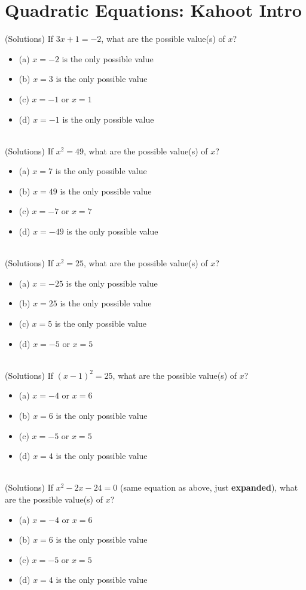 \documentclass{article}
\begin{document}
\clearpage
\section{Quadratic Equations: Kahoot Intro}
(Solutions) If $3x+1 = -2$, what are the possible value(s) of $x$?
\begin{itemize}
\item[] (a) $x=-2$ is the only possible value
\item[] (b) $x=3$ is the only possible value
\item[] (c) $x=-1$ or $x=1$
\item[] (d) $x=-1$ is the only possible value
\end{itemize}\hrulefill \\[10pt]
(Solutions) If $x^2 = 49$, what are the possible value(s) of $x$?
\begin{itemize}
\item[](a) $x=7$ is the only possible value
\item[](b) $x=49$ is the only possible value
\item[](c) $x=-7$ or $x=7$
\item[](d) $x=-49$ is the only possible value
\end{itemize}\hrulefill \\[10pt]
(Solutions) If $x^2 = 25$, what are the possible value(s) of $x$?
\begin{itemize}
\item[](a) $x=-25$ is the only possible value
\item[](b) $x=25$ is the only possible value
\item[](c) $x=5$ is the only possible value
\item[](d) $x=-5$ or $x=5$
\end{itemize}\hrulefill \\[10pt]
(Solutions) If $(x-1)^2 = 25$, what are the possible value(s) of $x$?
\begin{itemize}
\item[](a) $x=-4$ or $x=6$
\item[](b) $x=6$ is the only possible value
\item[](c) $x=-5$ or $x=5$
\item[](d) $x=4$ is the only possible value
\end{itemize}\hrulefill \\[10pt]
\clearpage
\noindent (Solutions) If $x^2 - 2x - 24 = 0$ (same equation as above, just \textbf{expanded}), what are the possible value(s) of $x$?
\begin{itemize}
\item[](a) $x=-4$ or $x=6$
\item[](b) $x=6$ is the only possible value
\item[](c) $x=-5$ or $x=5$
\item[](d) $x=4$ is the only possible value
\end{itemize}\hrulefill \\[10pt]
\end{document}
